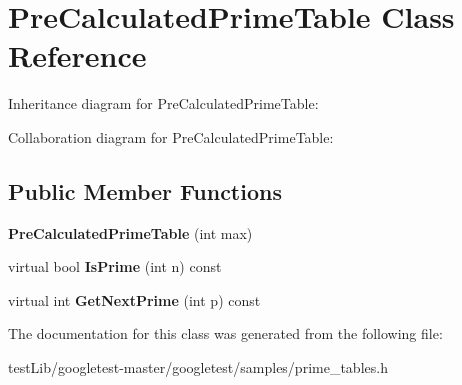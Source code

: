 \hypertarget{classPreCalculatedPrimeTable}{}\section{Pre\+Calculated\+Prime\+Table Class Reference}
\label{classPreCalculatedPrimeTable}


Inheritance diagram for Pre\+Calculated\+Prime\+Table\+:


Collaboration diagram for Pre\+Calculated\+Prime\+Table\+:
\subsection*{Public Member Functions}
\begin{DoxyCompactItemize}
\item 
\mbox{\label{classPreCalculatedPrimeTable_a6bb947504421e31da70d2c71576be350}} 
{\bfseries Pre\+Calculated\+Prime\+Table} (int max)
\item 
\mbox{\label{classPreCalculatedPrimeTable_a8a9ab7f99b09e5e987933c260e7304cf}} 
virtual bool {\bfseries Is\+Prime} (int n) const
\item 
\mbox{\label{classPreCalculatedPrimeTable_a0ff10b1fe13df7e56b8d7ed9f41d3998}} 
virtual int {\bfseries Get\+Next\+Prime} (int p) const
\end{DoxyCompactItemize}


The documentation for this class was generated from the following file\+:\begin{DoxyCompactItemize}
\item 
test\+Lib/googletest-\/master/googletest/samples/prime\+\_\+tables.\+h\end{DoxyCompactItemize}
